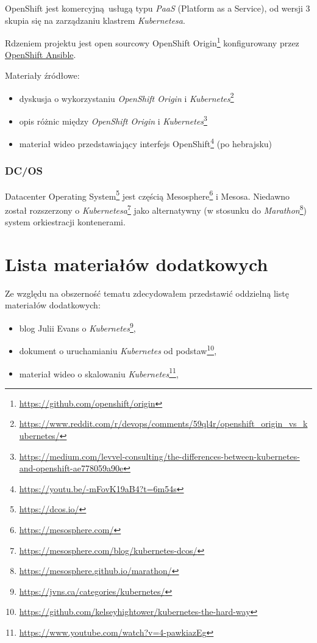 \documentclass[a4paper,12pt,twoside,openany]{report}
\providecommand{\tightlist}{%
  \setlength{\itemsep}{0pt}\setlength{\parskip}{0pt}}
\DeclareRobustCommand{\href}[2]{#2\footnote{\url{#1}}}
\begin{document}
OpenShift jest komercyjną~usługą typu \emph{PaaS} (Platform as a
Service), od wersji 3 skupia się na zarządzaniu klastrem
\emph{Kubernetesa}.

Rdzeniem projektu jest open sourcowy
\href{https://github.com/openshift/origin}{OpenShift Origin}
konfigurowany przez \protect\hyperlink{openshift-ansible}{OpenShift
Ansible}.

Materiały źródłowe:

\begin{itemize}
\tightlist
\item
  \href{https://www.reddit.com/r/devops/comments/59ql4r/openshift_origin_vs_kubernetes/}{dyskusja
  o wykorzystaniu \emph{OpenShift Origin} i \emph{Kubernetes}}
\item
  \href{https://medium.com/levvel-consulting/the-differences-between-kubernetes-and-openshift-ae778059a90e}{opis
  różnic między \emph{OpenShift Origin} i \emph{Kubernetes}}
\item
  \href{https://youtu.be/-mFovK19aB4?t=6m54s}{materiał wideo
  przedstawiający interfejs OpenShift} (po hebrajsku)
\end{itemize}

\hypertarget{dcos}{%
\subsubsection{DC/OS}\label{dcos}}

\href{https://dcos.io/}{Datacenter Operating System} jest częścią
\href{https://mesosphere.com/}{Mesosphere} i Mesosa. Niedawno został
rozszerzony o
\href{https://mesosphere.com/blog/kubernetes-dcos/}{\emph{Kubernetesa}}
jako alternatywny (w stosunku do
\href{https://mesosphere.github.io/marathon/}{\emph{Marathon}}) system
orkiestracji kontenerami.

\hypertarget{lista-materiaux142uxf3w-dodatkowych}{%
\section{Lista materiałów
dodatkowych}\label{lista-materiaux142uxf3w-dodatkowych}}

Ze względu na obszerność tematu zdecydowałem przedstawić oddzielną listę
materiałów dodatkowych:

\begin{itemize}
\tightlist
\item
  \href{https://jvns.ca/categories/kubernetes/}{blog Julii Evans o
  \emph{Kubernetes}},
\item
  \href{https://github.com/kelseyhightower/kubernetes-the-hard-way}{dokument
  o uruchamianiu \emph{Kubernetes} od podstaw},
\item
  \href{https://www.youtube.com/watch?v=4-pawkiazEg}{materiał wideo o
  skalowaniu \emph{Kubernetes}},
\end{itemize}
\end{document}
